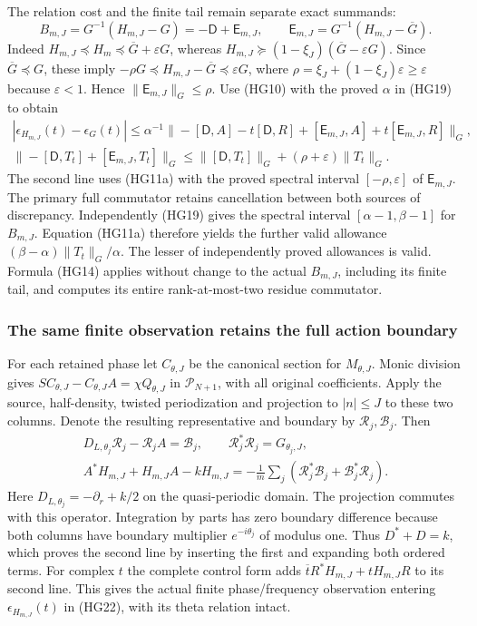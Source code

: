 The relation cost and the finite tail remain separate exact summands:
\[
 B_{m,J}=G^{-1}(H_{m,J}-G)=-\mathsf D+\mathsf E_{m,J},
 \qquad \mathsf E_{m,J}=G^{-1}(H_{m,J}-\overline G).
 \tag{HG21}
\]
Indeed $H_{m,J}\preceq H_m\preceq\overline G+\varepsilon G$,
whereas
$H_{m,J}\succeq(1-\xi_J)(\overline G-\varepsilon G)$.
Since $\overline G\preceq G$, these imply
$-\rho G\preceq H_{m,J}-\overline G\preceq\varepsilon G$,
where $\rho=\xi_J+(1-\xi_J)\varepsilon\ge\varepsilon$ because
$\varepsilon<1$. Hence $\|\mathsf E_{m,J}\|_G\le\rho$.
Use (HG10) with the proved $\alpha$ in (HG19) to obtain
\[
\begin{gathered}
 |\epsilon_{H_{m,J}}(t)-\epsilon_G(t)|
 \le\alpha^{-1}\|
 -[\mathsf D,A]-t[\mathsf D,R]
 +[\mathsf E_{m,J},A]+t[\mathsf E_{m,J},R]\|_G,\\
 \|-[\mathsf D,T_t]+[\mathsf E_{m,J},T_t]\|_G
 \le\|[\mathsf D,T_t]\|_G+(\rho+\varepsilon)\|T_t\|_G .
\end{gathered}\tag{HG22}
\]
The second line uses (HG11a) with the proved spectral interval
$[-\rho,\varepsilon]$ of $\mathsf E_{m,J}$.
The primary full commutator retains cancellation between both sources
of discrepancy. Independently (HG19) gives the spectral interval
$[\alpha-1,\beta-1]$ for $B_{m,J}$. Equation (HG11a) therefore
yields the further valid allowance
$(\beta-\alpha)\|T_t\|_G/\alpha$.
The lesser of independently proved allowances is valid. Formula (HG14)
applies without change to the actual $B_{m,J}$, including its finite
tail, and computes its entire rank-at-most-two residue commutator.

\subsubsection{The same finite observation retains the full action boundary}

For each retained phase let $C_{\theta,J}$ be the canonical section
for $M_{\theta,J}$. Monic division gives
$SC_{\theta,J}-C_{\theta,J}A=\chi Q_{\theta,J}$ in
$\mathcal P_{N+1}$, with all original coefficients. Apply the source,
half-density, twisted periodization and projection to $|n|\le J$
to these two columns. Denote the resulting representative and boundary
by $\mathscr R_j,\mathscr B_j$. Then
\[
\begin{gathered}
 D_{L,\theta_j}\mathscr R_j-\mathscr R_jA=\mathscr B_j,
 \qquad \mathscr R_j^*\mathscr R_j=G_{\theta_j,J},\\
 A^*H_{m,J}+H_{m,J}A-kH_{m,J}
   =-\frac1m\sum_j(\mathscr R_j^*\mathscr B_j+
                              \mathscr B_j^*\mathscr R_j).
\end{gathered}\tag{HG23}
\]
Here $D_{L,\theta_j}=-\partial_r+k/2$ on the quasi-periodic domain.
The projection commutes with this operator. Integration by parts has
zero boundary difference because both columns have boundary multiplier
$e^{-i\theta_j}$ of modulus one. Thus $D^*+D=k$, which proves the
second line by inserting the first and expanding both ordered terms.
For complex $t$ the complete control form adds
$\overline t R^*H_{m,J}+tH_{m,J}R$ to its second line.
This gives the actual finite phase/frequency observation entering
$\epsilon_{H_{m,J}}(t)$ in (HG22), with its theta relation intact.

